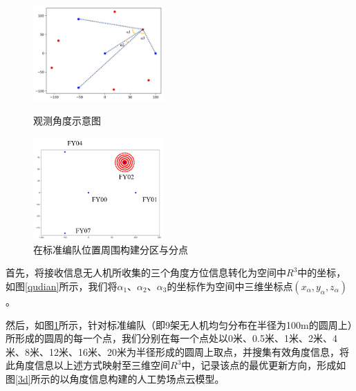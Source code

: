 \documentclass{my_paper}
\begin{document}
\begin{figure}[htbp]
    \centering
    \begin{minipage}[t]{0.48\textwidth}
        \centering
        \includegraphics[width=5cm]{qudian.jpg}
        \caption{观测角度示意图}
        \label{qudian}
    \end{minipage}
    \begin{minipage}[t]{0.48\textwidth}
        \centering
        \includegraphics[width=5cm]{fenqu.png}
        \caption{在标准编队位置周围构建分区与分点}
        \label{fenqu}
    \end{minipage}
\end{figure}


首先，将接收信息无人机所收集的三个角度方位信息转化为空间中$R^3$中的坐标，如图\ref{qudian}所示，我们将$\alpha_1$、$\alpha_2$、$\alpha_3$的坐标作为空间中三维坐标点$(x_{\alpha},y_{\alpha},z_{\alpha})$。

然后，如图\ref{fenqu}所示，针对标准编队（即9架无人机均匀分布在半径为100m的圆周上）所形成的圆周的每一个点，我们分别在每一个点处以0米、0.5米、1米、2米、4米、8米、12米、16米、20米为半径形成的圆周上取点，并搜集有效角度信息，将此角度信息以上述方式映射至三维空间$R^{3}$中，记录该点的最优更新方向，形成如图\ref{3d}所示的以角度信息构建的人工势场点云模型。
\end{document}
